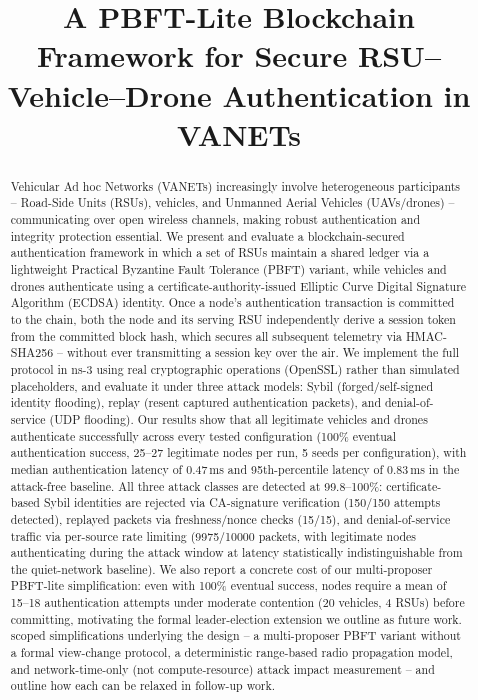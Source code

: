 \documentclass[conference]{IEEEtran}
\begin{document}
\title{A PBFT-Lite Blockchain Framework for Secure RSU--Vehicle--Drone
Authentication in VANETs}

\author{
}

\maketitle

\begin{abstract}
Vehicular Ad hoc Networks (VANETs) increasingly involve heterogeneous
participants -- Road-Side Units (RSUs), vehicles, and Unmanned Aerial
Vehicles (UAVs/drones) -- communicating over open wireless channels,
making robust authentication and integrity protection essential.
We present and evaluate a blockchain-secured authentication framework
in which a set of RSUs maintain a shared ledger via a lightweight
Practical Byzantine Fault Tolerance (PBFT) variant, while vehicles and
drones authenticate using a certificate-authority-issued Elliptic
Curve Digital Signature Algorithm (ECDSA) identity. Once a node's
authentication transaction is committed to the chain, both the node
and its serving RSU independently derive a session token from the
committed block hash, which secures all subsequent telemetry via
HMAC-SHA256 -- without ever transmitting a session key over the air.
We implement the full protocol in ns-3 using real cryptographic
operations (OpenSSL) rather than simulated placeholders, and evaluate
it under three attack models: Sybil (forged/self-signed identity
flooding), replay (resent captured authentication packets), and
denial-of-service (UDP flooding). Our results show that all legitimate vehicles and drones authenticate
successfully across every tested configuration (100\% eventual
authentication success, 25--27 legitimate nodes per run, 5 seeds per
configuration), with median authentication latency of 0.47\,ms and
95th-percentile latency of 0.83\,ms in the attack-free baseline.
All three attack classes are detected at 99.8--100\%: certificate-based
Sybil identities are rejected via CA-signature verification (150/150
attempts detected), replayed packets via freshness/nonce checks (15/15),
and denial-of-service traffic via per-source rate limiting (9975/10000
packets, with legitimate nodes authenticating during the attack window
at latency statistically indistinguishable from the quiet-network
baseline). We also report a concrete cost of our multi-proposer PBFT-lite
simplification: even with 100\% eventual success, nodes require a mean
of 15--18 authentication attempts under moderate contention (20 vehicles,
4 RSUs) before committing, motivating the formal leader-election
extension we outline as future work.
scoped simplifications underlying the design -- a multi-proposer PBFT
variant without a formal view-change protocol, a deterministic
range-based radio propagation model, and network-time-only (not
compute-resource) attack impact measurement -- and outline how each
can be relaxed in follow-up work.
\end{abstract}
\end{document}
